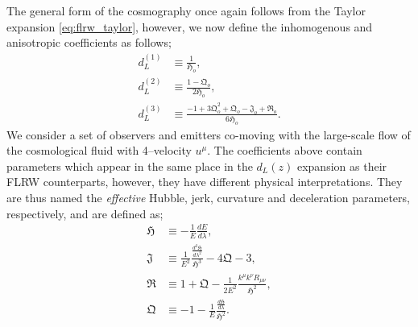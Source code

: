 \documentclass[fleqn,usenatbib]{mnras}
\begin{document}
The general form of the cosmography once again follows from {the Taylor expansion} \eqref{eq:flrw_taylor}, however, we now define %
the inhomogenous and anisotropic coefficients %
as follows; 
\begin{subequations}
\begin{align}
d^{(1)}_{L} &\equiv \frac{1}{\mathfrak{H}_o},\\
d^{(2)}_{L} &\equiv \frac{1-\mathfrak{Q}_o} {2\mathfrak{H}_o},\\
d^{(3)}_{L} &\equiv \frac{-1 + 3\mathfrak{Q}_o^2 + \mathfrak{Q}_o- \mathfrak{J}_o + \mathfrak{R}_o}{6\mathfrak{H}_o}.
\end{align}
\end{subequations}
We consider a set of observers and emitters co-moving with the large-scale flow of the cosmological fluid with 4--velocity $u^\mu$.
The coefficients above %
{contain} %
parameters which appear in the same place in the $d_L(z)$ {expansion} %
as {their} FLRW counterparts, %
{however, they} have different physical interpretations. {They are thus named the \textit{effective}} Hubble, jerk, curvature and deceleration parameters, respectively, {and} are defined as; 
\begin{subequations}\label{eqs:effective_params}
\begin{align}
\label{eq:effective_hubble}
\mathfrak{H} &\equiv -\frac{1}{E}\frac{dE}{d\lambda},\\
\mathfrak{J} &\equiv \frac{1}{E^2} \frac{\frac{d^2\mathfrak{H}}{d\lambda^2}}{\mathfrak{H}^3}  -4\mathfrak{Q}-3,\label{eq:effective_jerk}\\
\mathfrak{R} &\equiv 1 + \mathfrak{Q} - \frac{1}{2E^2}\frac{k^{\mu}k^{\nu}R_{\mu\nu}}{\mathfrak{H}^2},
\label{eq:effective_curvature}\\
\mathfrak{Q} &\equiv -1 - \frac{1}{E}\frac{\frac{d\mathfrak{H}}{d\lambda}}{\mathfrak{H}^2}.
\label{eq: effective_decel}
\end{align}
\end{subequations}
\end{document}
